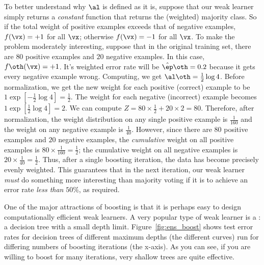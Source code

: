 To better understand why $\al$ is defined as it is, suppose that our
weak learner simply returns a \emph{constant} function that returns
the (weighted) majority class.  So if the total weight of positive
examples exceeds that of negative examples, $f(\vx) = +1$ for all
$\vx$; otherwise $f(\vx) = -1$ for all $\vx$.  To make the problem
moderately interesting, suppose that in the original training set,
there are $80$ positive examples and $20$ negative examples.  In this
case, $f\oth(\vx)=+1$.  It's weighted error rate will be $\hat\ep\oth
= 0.2$ because it gets every negative example wrong.  Computing, we
get $\al\oth = \frac12\log 4$.  Before normalization, we get the new
weight for each positive (correct) example to be $1 \exp[-\frac12\log
4] = \frac12$.  The weight for each negative (incorrect) example
becomes $1 \exp[\frac12\log 4] = 2$.  We can compute $Z = 80 \times
\frac 1 2 + 20 \times 2 = 80$.  Therefore, after normalization, the
weight distribution on any single positive example is $\frac 1 {160}$
and the weight on any negative example is $\frac 1 {40}$.  However,
since there are $80$ positive examples and $20$ negative examples, the
\emph{cumulative} weight on all positive examples is $80 \times \frac
1 {160} = \frac 1 2$; the cumulative weight on all negative examples
is $20 \times \frac 1{40} = \frac12$.  Thus, after a single boosting
iteration, the data has become precisely evenly weighted.  This
guarantees that in the next iteration, our weak learner \emph{must} do
something more interesting than majority voting if it is to achieve an
error rate \emph{less than} $50\%$, as required.



One of the major attractions of boosting is that it is perhaps easy to
design computationally efficient weak learners.  A very popular type
of weak learner is a : a decision tree
with a small depth limit.  Figure~\ref{fig:ens_boost} shows test error
rates for decision trees of different maximum depths (the different
curves) run for differing numbers of boosting iterations (the
x-axis).  As you can see, if you are willing to boost for many
iterations, very shallow trees are quite effective.


